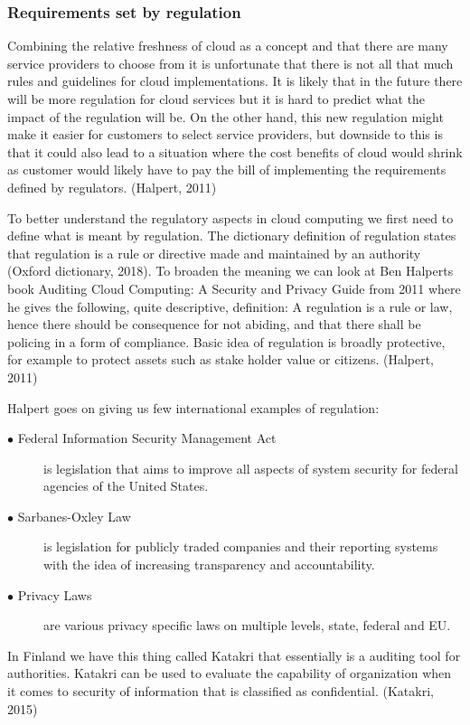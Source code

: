 \documentclass{article}
\begin{document}
\subsubsection{Requirements set by regulation}
Combining the relative freshness of cloud as a concept and that there are many service providers to choose from it is unfortunate that there is not all that much rules and guidelines for cloud implementations.
It is likely that in the future there will be more regulation for cloud services but it is hard to predict what the impact of the regulation will be. On the other hand, this new regulation might make it easier for customers to select service providers, but downside to this is that it could also lead to a situation where the cost benefits of cloud would shrink as customer would likely have to pay the bill of implementing the requirements defined by regulators. (Halpert, 2011)
\par
To better understand the regulatory aspects in cloud computing we first need to define what is meant by regulation.
The dictionary definition of regulation states that regulation is a rule or directive made and maintained by an authority (Oxford dictionary, 2018).
To broaden the meaning we can look at Ben Halperts book Auditing Cloud Computing: A Security and Privacy Guide from 2011 where he gives the following, quite descriptive, definition: A regulation is a rule or law, hence there should be consequence for not abiding, and that there shall be policing in a form of compliance. Basic idea of regulation is broadly protective, for example to protect assets such as stake holder value or citizens. (Halpert, 2011)
\par
Halpert goes on giving us few international examples of regulation:
\begin{description}
	\item[$\bullet$ Federal Information Security Management Act] is legislation that aims to improve all aspects of system security for federal agencies of the United States.
	\item[$\bullet$ Sarbanes-Oxley Law] is legislation for publicly traded companies and their reporting systems with the idea of increasing transparency and accountability.
	\item[$\bullet$ Privacy Laws] are various privacy specific laws on multiple levels, state, federal and EU.
\end{description}
In Finland we have this thing called Katakri that essentially is a auditing tool for authorities. Katakri can be used to evaluate the capability of organization when it comes to security of information that is classified as confidential. (Katakri, 2015)
\end{document}
